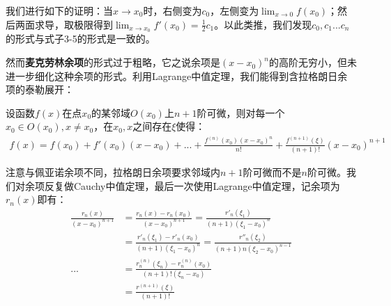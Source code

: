 \documentclass{ctexart}
\let\oldtextbf\textbf %
\renewcommand{\textbf}[1]{\textcolor{btex}{\oldtextbf{#1}}} %
\begin{document}
我们进行如下的证明：当$x\to x_0$时，右侧变为$c_0$，左侧变为$\lim_{x\to 0}f(x_0)$；然后两面求导，取极限得到$\lim_{x\to x_0}f'(x_0)=\frac{1}{2}c_1$。以此类推，我们发现$c_0,c_1...c_n$的形式与式子3-5的形式是一致的。

然而\textbf{麦克劳林余项}的形式过于粗略，它之说余项是$(x-x_0)^n$的高阶无穷小，但未进一步细化这种余项的形式。利用Lagrange中值定理，我们能得到含拉格朗日余项的泰勒展开：
\begin{tcolorbox}[
    colback=bac1,     %
    colframe=fra1,   %
    coltitle=white,             %
    coltext=tex1,
    title=含拉格朗日余项的泰勒展开,
    fonttitle=\bfseries,        %
arc=3mm,                     %
breakable
]
设函数$f(x)$在点$x_0$的某邻域$O(x_0)$上$n+1$阶可微，则对每一个$x_0\in O(x_0),x\neq x_0$，在$x_0,x$之间存在$\xi$使得：
\begin{align*}
     f(x)=f(x_0)+f'(x_0)(x-x_0)+...+\frac{f^{(n)}(x_0)(x-x_0)^n}{n!}+\frac{f^{(n+1)}(\xi)}{(n+1)!}(x-x_0)^{n+1}\tag{3-6}
\end{align*}
\end{tcolorbox}

注意与佩亚诺余项不同，拉格朗日余项要求邻域内$n+1$阶可微而不是$n$阶可微。我们对余项反复做Cauchy中值定理，最后一次使用Lagrange中值定理，记余项为$r_n(x)$即有：
\begin{align*}
  \frac{r_n(x)}{(x-x_0)^{n+1}}&=\frac{r_n(x)-r_n(x_0)}{(x-x_0)^{n+1}}=\frac{r'_n(\xi_1)}{(n+1)(\xi_1-x_0)^n}\\
    &=\frac{r'_n(\xi_1)-r'_n(x_0)}{(n+1)(\xi_1-x_0)^{n}}=\frac{r''_n(\xi_2)}{(n+1)n(\xi_2-x_0)^{n-1}}\\
...&=\frac{r^{(n)}_n(\xi_n)-r^{(n)}_n(x_0)}{(n+1)!(\xi_n-x_0)}\\
&=\frac{r^{(n+1)}(\xi)}{(n+1)!} 
\end{align*}
\end{document}
